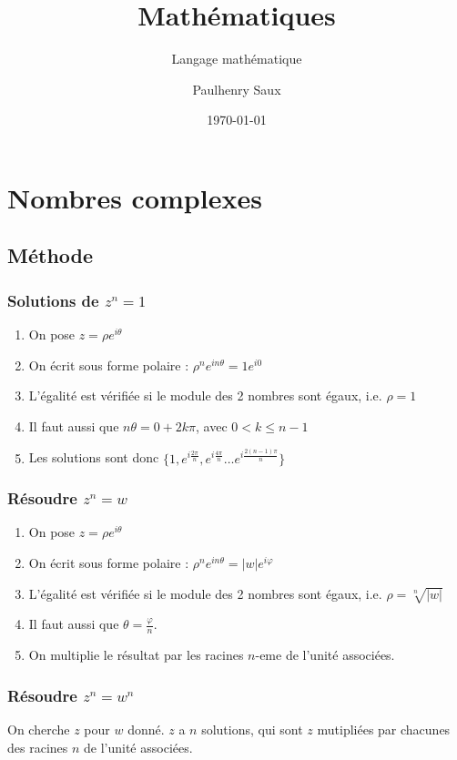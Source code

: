 \documentclass[french]{yLectureNote}
\title{Mathématiques}
\subtitle{Langage mathématique}
\author{Paulhenry Saux}
\date{\today}
\begin{document}
\setcounter{chapter}{5}

	\chapter{Nombres complexes}
\section{Méthode}
\subsection{Solutions de $z^n=1$}
\begin{enumerate}
 \item On pose $z=\rho e^{i\theta}$
 \item On écrit sous forme polaire : $\rho^ne^{in\theta} = 1e^{i0}$
 \item L'égalité est vérifiée si le module des 2 nombres sont égaux, i.e. $\rho = 1$
 \item Il faut aussi que $n\theta = 0+2k\pi$, avec $0<k\leq n-1$
 \item Les solutions sont donc $\{1, e^{i\frac{2\pi}{n}}, e^{i\frac{4\pi}{n}}\dots e^{i\frac{2(n-1)\pi}{n}}\}$
\end{enumerate}
\subsection{Résoudre $z^n = w$}
\begin{enumerate}
 \item On pose $z=\rho e^{i\theta}$
 \item On écrit sous forme polaire : $\rho^ne^{in\theta} = |w|e^{i\varphi}$
 \item L'égalité est vérifiée si le module des 2 nombres sont égaux, i.e. $\rho = \sqrt[n]{|w|}$
 \item Il faut aussi que $\theta = \frac{\varphi}{n}$.
 \item On multiplie le résultat par les racines $n$-eme de l'unité associées.
\end{enumerate}
\subsection{Résoudre $z^n = w^n$}
On cherche $z$ pour $w$ donné. $z$ a $n$ solutions, qui sont $z$ mutipliées par chacunes des racines $n$ de l'unité associées.
\end{document}

